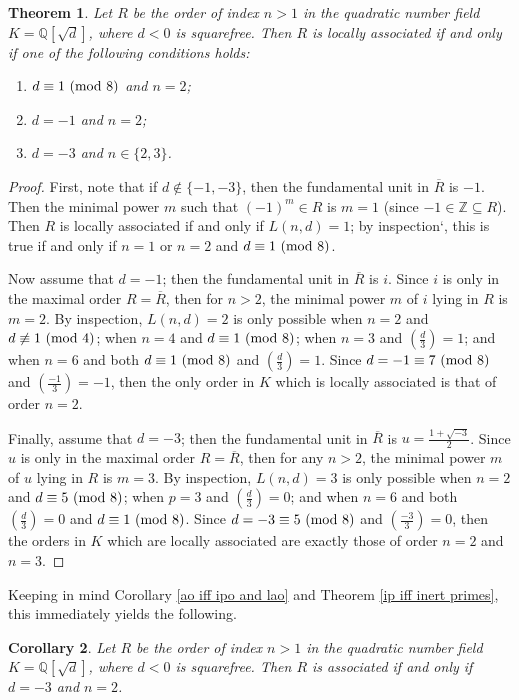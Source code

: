 \documentclass[12pt]{amsart}
\newtheorem{theorem}{Theorem}[section]
\newtheorem{corollary}[theorem]{Corollary}
\theoremstyle{definition}
\newcommand{\kron}[2]{\left(\frac{#1}{#2}\right)}
\newcommand{\bZ}{\mathbb Z}
\newcommand{\bQ}{\mathbb Q}
\newcommand{\Rbar}{\overline{R}}
\newcommand{\modulo}[1]{\textup{ (mod }#1)}
\begin{document}
	\begin{theorem}
		\label{la non-real quad}
		Let $R$ be the order of index $n>1$ in the quadratic number field $K=\bQ[\sqrt{d}]$, where $d<0$ is squarefree. Then $R$ is locally associated if and only if one of the following conditions holds:
		\begin{enumerate}
			\item $d\equiv 1\modulo{8}$ and $n=2$;
			\item $d=-1$ and $n=2$;
			\item $d=-3$ and $n\in\{2,3\}$.
		\end{enumerate}
	\end{theorem}
	
	\begin{proof}
		First, note that if $d\notin\{-1,-3\}$, then the fundamental unit in $\Rbar$ is $-1$. Then the minimal power $m$ such that $(-1)^m\in R$ is $m=1$ (since $-1\in\bZ\subseteq R$). Then $R$ is locally associated if and only if $L(n,d)=1$; by inspection`, this is true if and only if $n=1$ or $n=2$ and $d\equiv 1\modulo{8}$.
		
		Now assume that $d=-1$; then the fundamental unit in $\Rbar$ is $i$. Since $i$ is only in the maximal order $R=\Rbar$, then for $n>2$, the minimal power $m$ of $i$ lying in $R$ is $m=2$. By inspection, $L(n,d)=2$ is only possible when $n=2$ and $d\not\equiv 1\modulo{4}$; when $n=4$ and $d\equiv 1\modulo{8}$; when $n=3$ and $\kron{d}{3}=1$; and when $n=6$ and both $d\equiv 1\modulo{8}$ and $\kron{d}{3}=1$. Since $d=-1\equiv 7\modulo{8}$ and $\kron{-1}{3}=-1$, then the only order in $K$ which is locally associated is that of order $n=2$.
		
		Finally, assume that $d=-3$; then the fundamental unit in $\Rbar$ is $u=\frac{1+\sqrt{-3}}{2}$. Since $u$ is only in the maximal order $R=\Rbar$, then for any $n>2$, the minimal power $m$ of $u$ lying in $R$ is $m=3$. By inspection, $L(n,d)=3$ is only possible when $n=2$ and $d\equiv 5\modulo{8}$; when $p=3$ and $\kron{d}{3}=0$; and when $n=6$ and both $\kron{d}{3}=0$ and $d\equiv 1\modulo{8}$. Since $d=-3\equiv 5\modulo{8}$ and $\kron{-3}{3}=0$, then the orders in $K$ which are locally associated are exactly those of order $n=2$ and $n=3$.
	\end{proof}
	
	Keeping in mind Corollary \ref{ao iff ipo and lao} and Theorem \ref{ip iff inert primes}, this immediately yields the following.
	
	\begin{corollary}
		\label{associated non-real quad}
		Let $R$ be the order of index $n>1$ in the quadratic number field $K=\bQ[\sqrt{d}]$, where $d<0$ is squarefree. Then $R$ is associated if and only if $d=-3$ and $n=2$.
	\end{corollary}
	
\end{document}
